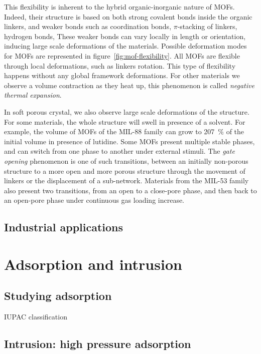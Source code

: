 \documentclass[thesis]{subfiles}
\begin{document}
This flexibility is inherent to the hybrid organic-inorganic nature of MOFs.
Indeed, their structure is based on both strong covalent bonds inside the
organic linkers, and weaker bonds such as coordination bonds, $\pi$-stacking of
linkers, hydrogen bonds, \etc These weaker bonds can vary locally in length or
orientation, inducing large scale deformations of the materials. Possible
deformation modes for MOFs are represented in figure~\ref{fig:mof-flexibility}.
All MOFs are flexible through local deformations, such as linkers rotation. This
type of flexibility happens without any global framework deformations. For other
materials we observe a volume contraction as they heat up, this phenomenon is
called \emph{negative thermal expansion}\cite{Dubbeldam2007}.

In soft porous crystal, we also observe large scale deformations of the
structure. For some materials, the whole structure will swell in presence of a
solvent. For example, the volume of MOFs of the MIL-88 family can grow to 207~\%
of the initial volume in presence of lutidine\cite{Serre2007}. Some MOFs present
multiple stable phases, and can switch from one phase to another under external
stimuli. The \emph{gate opening} phenomenon is one of such transitions, between
an initially non-porous structure to a more open and more porous structure
through the movement of linkers or the displacement of a sub-network. Materials
from the MIL-53 family also present two transitions, from an open to a
close-pore phase, and then back to an open-pore phase\cite{Serre2002} under
continuous gas loading increase.

\subsection{Industrial applications}

\newpage
\section{Adsorption and intrusion}

\subsection{Studying adsorption}

IUPAC classification

\subsection{Intrusion: high pressure adsorption}
\end{document}
